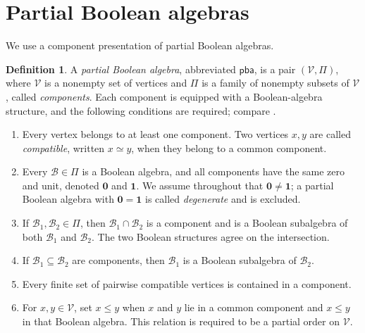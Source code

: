 \documentclass{article}   	%
\theoremstyle{plain}
\theoremstyle{definition}
\newtheorem{definition}[theorem]{Definition}
\theoremstyle{remark}
\newcommand{\pba}{\mathsf{pba}}
\begin{document}
\section{Partial Boolean algebras}
\label{sec:pba}

We use a component presentation of partial Boolean algebras.
\begin{definition}\label{def:pba}
A
\emph{partial Boolean algebra}, abbreviated $\pba$, is a pair
$(\mathcal V,\Pi)$, where $\mathcal V$ is a nonempty set of vertices and
$\Pi$ is a family of nonempty subsets of $\mathcal V$, called
\emph{components}.  Each component is equipped with a Boolean-algebra
structure, and the following conditions are required; compare
\cite[pp.~126--127]{Varadarajan}.

\begin{enumerate}
\item[\rm(P1)] Every vertex belongs to at least one component.  Two vertices
$x,y$ are called \emph{compatible}, written $x\simeq y$, when they belong to a
common component.

\item[\rm(P2)] Every $\mathcal B\in\Pi$ is a Boolean algebra, and all
components have the same zero and unit, denoted $\mathbf 0$ and $\mathbf 1$.
We assume throughout that $\mathbf 0\ne\mathbf 1$; a partial Boolean algebra
with $\mathbf 0=\mathbf 1$ is called \emph{degenerate} and is excluded.

\item[\rm(P3)] If $\mathcal B_1,\mathcal B_2\in\Pi$, then
$\mathcal B_1\cap\mathcal B_2$ is a component and is a Boolean subalgebra of
both $\mathcal B_1$ and $\mathcal B_2$.  The two Boolean structures agree on
the intersection.

\item[\rm(P4)] If $\mathcal B_1\subseteq\mathcal B_2$ are components, then
$\mathcal B_1$ is a Boolean subalgebra of $\mathcal B_2$.

\item[\rm(P5)] Every finite set of pairwise compatible vertices is contained
in a component.

\item[\rm(P6)] For $x,y\in\mathcal V$, set $x\le y$ when $x$ and $y$ lie in a
common component and $x\le y$ in that Boolean algebra.  This relation is
required to be a partial order on $\mathcal V$.
\end{enumerate}

\end{definition}
\end{document}
